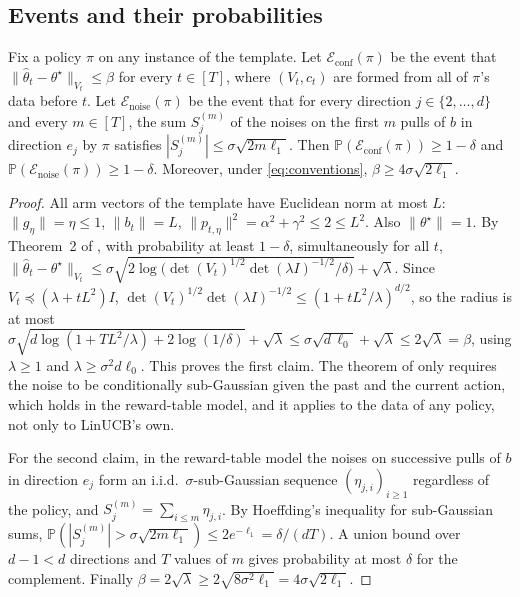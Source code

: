 \documentclass[anon]{alt2027} %
\newcommand{\Prb}{\mathbb{P}}
\begin{document}
\subsection{Events and their probabilities}

\begin{lemma}
\label{lem:cat-events}
Fix a policy $\pi$ on any instance of the template. Let
$\mathcal E_{\mathrm{conf}}(\pi)$ be the event that
$\|\widehat\theta_t-\theta^\star\|_{V_t}\le\beta$ for every $t\in[T]$, where
$(V_t,c_t)$ are formed from all of $\pi$'s data before $t$. Let
$\mathcal E_{\mathrm{noise}}(\pi)$ be the event that for every direction
$j\in\{2,\dots,d\}$ and every $m\in[T]$, the sum $S_j^{(m)}$ of the noises on
the first $m$ pulls of $b$ in direction $e_j$ by $\pi$ satisfies
$|S_j^{(m)}|\le\sigma\sqrt{2m\ell_1}$. Then
$\Prb(\mathcal E_{\mathrm{conf}}(\pi))\ge1-\delta$ and
$\Prb(\mathcal E_{\mathrm{noise}}(\pi))\ge1-\delta$. Moreover, under
\eqref{eq:conventions}, $\beta\ge4\sigma\sqrt{2\ell_1}$.
\end{lemma}

\begin{proof}
All arm vectors of the template have Euclidean norm at most $L$: $\|g_\eta\|=\eta\le1$,
$\|b_t\|=L$, $\|p_{t,\eta}\|^2=\alpha^2+\gamma^2\le2\le L^2$. Also $\|\theta^\star\|=1$.
By Theorem~2 of \citet{abbasi2011improved}, with probability at least
$1-\delta$, simultaneously for all $t$,
$\|\widehat\theta_t-\theta^\star\|_{V_t}\le\sigma\sqrt{2\log\bigl(\det(V_t)^{1/2}\det(\lambda I)^{-1/2}/\delta\bigr)}+\sqrt\lambda$.
Since $V_t\preceq(\lambda+tL^2)I$, $\det(V_t)^{1/2}\det(\lambda I)^{-1/2}\le(1+tL^2/\lambda)^{d/2}$,
so the radius is at most
$\sigma\sqrt{d\log(1+TL^2/\lambda)+2\log(1/\delta)}+\sqrt\lambda\le\sigma\sqrt{d\,\ell_0}+\sqrt\lambda\le2\sqrt\lambda=\beta$,
using $\lambda\ge1$ and $\lambda\ge\sigma^2d\ell_0$. This proves the first claim.
The theorem of \citet{abbasi2011improved} only requires the noise to be
conditionally sub-Gaussian given the past and the current action, which holds
in the reward-table model, and it applies to the data of any policy, not only
to LinUCB's own.

For the second claim, in the reward-table model the noises on successive pulls
of $b$ in direction $e_j$ form an i.i.d.\ $\sigma$-sub-Gaussian sequence
$(\eta_{j,i})_{i\ge1}$ regardless of the policy, and $S_j^{(m)}=\sum_{i\le m}\eta_{j,i}$.
By Hoeffding's inequality for sub-Gaussian sums,
$\Prb(|S_j^{(m)}|>\sigma\sqrt{2m\ell_1})\le2e^{-\ell_1}=\delta/(dT)$. A union
bound over $d-1<d$ directions and $T$ values of $m$ gives probability at most
$\delta$ for the complement. Finally $\beta=2\sqrt\lambda\ge2\sqrt{8\sigma^2\ell_1}=4\sigma\sqrt{2\ell_1}$.
\end{proof}
\end{document}
